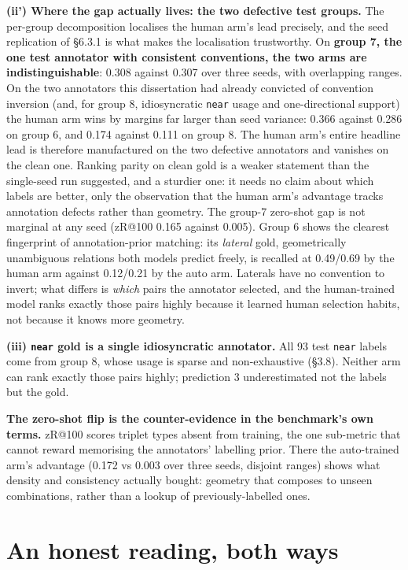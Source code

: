 \textbf{(ii') Where the gap actually lives: the two defective test groups.} The per-group decomposition localises the human arm's lead precisely, and the seed replication of \S6.3.1 is what makes the localisation trustworthy. On \textbf{group 7, the one test annotator with consistent conventions, the two arms are indistinguishable}: 0.308 against 0.307 over three seeds, with overlapping ranges. On the two annotators this dissertation had already convicted of convention inversion (and, for group 8, idiosyncratic \texttt{near} usage and one-directional support) the human arm wins by margins far larger than seed variance: 0.366 against 0.286 on group 6, and 0.174 against 0.111 on group 8. The human arm's entire headline lead is therefore manufactured on the two defective annotators and vanishes on the clean one. Ranking parity on clean gold is a weaker statement than the single-seed run suggested, and a sturdier one: it needs no claim about which labels are better, only the observation that the human arm's advantage tracks annotation defects rather than geometry. The group-7 zero-shot gap is not marginal at any seed (zR@100 0.165 against 0.005). Group 6 shows the clearest fingerprint of annotation-prior matching: its \textit{lateral} gold, geometrically unambiguous relations both models predict freely, is recalled at 0.49/0.69 by the human arm against 0.12/0.21 by the auto arm. Laterals have no convention to invert; what differs is \textit{which} pairs the annotator selected, and the human-trained model ranks exactly those pairs highly because it learned human selection habits, not because it knows more geometry.

\textbf{(iii) \texttt{near} gold is a single idiosyncratic annotator.} All 93 test \texttt{near} labels come from group 8, whose usage is sparse and non-exhaustive (\S3.8). Neither arm can rank exactly those pairs highly; prediction 3 underestimated not the labels but the gold.

\textbf{The zero-shot flip is the counter-evidence in the benchmark's own terms.} zR@100 scores triplet types absent from training, the one sub-metric that cannot reward memorising the annotators' labelling prior. There the auto-trained arm's advantage (0.172 vs 0.003 over three seeds, disjoint ranges) shows what density and consistency actually bought: geometry that composes to unseen combinations, rather than a lookup of previously-labelled ones.

\section{An honest reading, both ways}


